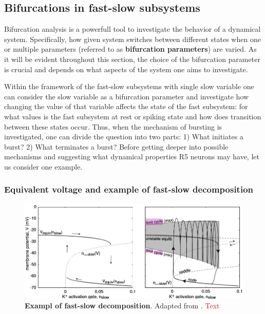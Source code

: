 \documentclass[../main.tex]{subfiles}
\begin{document}
\subsection{Bifurcations in fast-slow subsystems}

Bifurcation analysis is a powerfull tool to investigate the behavior of
a dynamical system. Specifically, how given system switches between
different states when one or multiple parameters (referred to as \textbf{bifurcation parameters})
are varied. As it will be evident throughout this section, the choice of the
bifurcation parameter is crucial and depends on
what aspects of the system one aims to investigate.

Within the framework of the fast-slow subsystems with single slow variable
one can consider the slow variable as a bifurcation parameter and investigate
how changing the value of that variable affects the state of the fast subsystem:
for what values is the fast subsystem at rest or spiking state and how does transition
between these states occur. Thus, when the mechanism of bursting is investigated,
one can divide the question into two parts: 1) What initiates a burst? 2) What terminates a burst?
Before getting deeper into possible mechanisms and suggesting what dynamical properties
R5 neurons may have, let us consider one example.

\subsubsection{Equivalent voltage and example of fast-slow decomposition}

\begin{figure}[!t]
    \centering
    \includegraphics[width=0.85\linewidth]{../img/2_mathematical_overview/fast_slow_system_example.png}
    \caption[Example of fast-slow decomposition]{
        \textbf{Exampl of fast-slow decomposition}.
        Adapted from \cite{izhikevichDynamicalSystemsNeuroscience2006}.
        \textcolor{red}{Text}
    }
    \label{fig:example_fast_slow_decomposition}
\end{figure}
\end{document}
